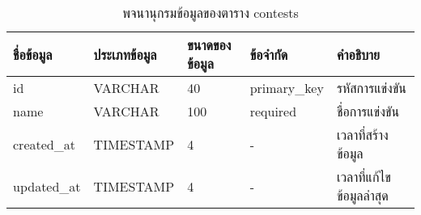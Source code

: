 \begin{table}[H]
    \caption{พจนานุกรมข้อมูลของตาราง contests}
    \label{tab:database-contests}
    \begin{tabularx}{\textwidth}{ | p{2.25cm} | p{2.20cm} | p{2.45cm} | p{2cm} | X | }
    \hline
    \textbf{ชื่อข้อมูล} & \textbf{ประเภทข้อมูล} & \textbf{ขนาดของข้อมูล} & \textbf{ข้อจำกัด} & \textbf{คำอธิบาย} \\
    \hline
    id & VARCHAR & 40 & primary\_key & รหัสการแข่งขัน \\
    \hline
    name & VARCHAR & 100 & required & ชื่อการแข่งขัน \\
    \hline
    created\_at & TIMESTAMP & 4 & - & เวลาที่สร้างข้อมูล \\
    \hline
    updated\_at & TIMESTAMP & 4 & - & เวลาที่แก้ไขข้อมูลล่าสุด \\
    \hline
    \end{tabularx}
\end{table}
